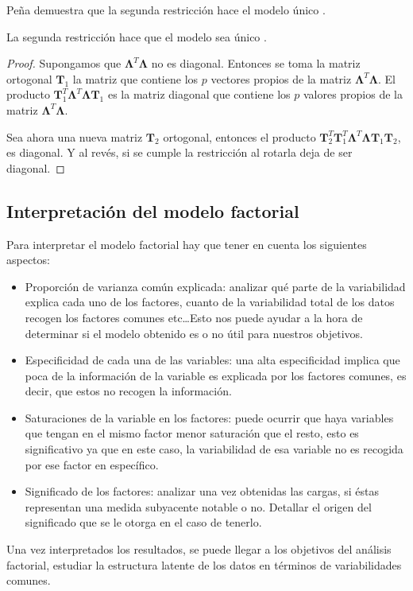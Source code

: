 \noindent Peña demuestra que la segunda restricción hace el modelo único \cite{Peña 2002}.

\begin{propo}
La segunda restricción hace que el modelo sea único . 
\begin{proof}
Supongamos que $\mathbf{\Lambda}^T\mathbf{\Lambda}$ no es diagonal. Entonces se toma la matriz ortogonal $\mathbf{T}_1$ la matriz que contiene los $p$ vectores propios de la matriz $\mathbf{\Lambda}^T\mathbf{\Lambda}$. El producto $\mathbf{T}_1^T \mathbf{\Lambda}^T \mathbf{\Lambda}\mathbf{T}_1$ es la matriz diagonal que contiene los $p$ valores propios de la matriz $\mathbf{\Lambda}^T\mathbf{\Lambda}$. 

\noindent Sea ahora una nueva matriz $\mathbf{T}_2$ ortogonal, entonces el producto $\mathbf{T}_2^T\mathbf{T}_1^T \mathbf{\Lambda}^T \mathbf{\Lambda}\mathbf{T}_1\mathbf{T}_2$, es diagonal. Y al revés, si se cumple la restricción  al rotarla deja de ser diagonal.  
\end{proof}
\end{propo}
\subsection{Interpretación del modelo factorial}

\noindent Para interpretar el modelo factorial hay que tener en cuenta los siguientes aspectos:
\begin{itemize}
\item Proporción de varianza común explicada: analizar qué parte de la variabilidad explica  cada uno de los factores, cuanto de la variabilidad total de los datos recogen los factores comunes etc\ldots Esto nos puede ayudar a la hora de determinar si el modelo obtenido es o no útil para nuestros objetivos. 
\item Especificidad de cada una de las variables: una alta especificidad implica que poca de la información de la variable es explicada por los factores comunes, es decir, que estos no recogen la información. 
\item Saturaciones de la variable en los factores: puede ocurrir que haya variables que tengan en el mismo factor menor saturación que el resto, esto es significativo ya que en este caso, la variabilidad de esa variable no es recogida por ese factor en específico.

\item Significado de los factores:  analizar una vez obtenidas las cargas, si  éstas representan una medida subyacente notable o no. Detallar el origen del significado que se le otorga en el caso de tenerlo.
\end{itemize}

\noindent Una vez interpretados los resultados, se puede llegar a los objetivos del análisis factorial, estudiar la estructura latente de los datos en términos de variabilidades comunes. 
